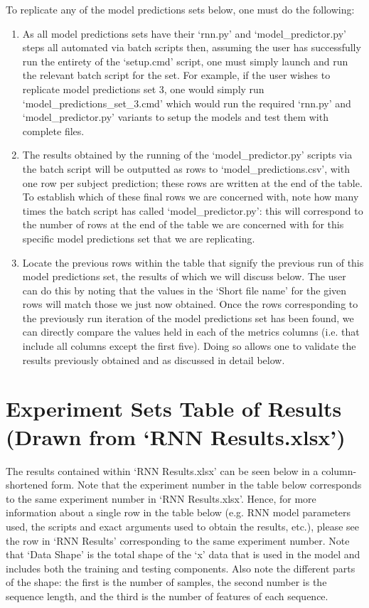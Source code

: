 \documentclass[12pt,twoside]{report}
\begin{document}
\quad To replicate any of the model predictions sets below, one must do the following:

\begin{enumerate}
	\item As all model predictions sets have their ‘rnn.py’ and ‘model\_predictor.py’ steps all automated via batch scripts then, assuming the user has successfully run the entirety of the ‘setup.cmd’ script, one must simply launch and run the relevant batch script for the set. For example, if the user wishes to replicate model predictions set 3, one would simply run ‘model\_predictions\_set\_3.cmd’ which would run the required ‘rnn.py’ and ‘model\_predictor.py’ variants to setup the models and test them with complete files.
	\item The results obtained by the running of the ‘model\_predictor.py’ scripts via the batch script will be outputted as rows to ‘model\_predictions.csv’, with one row per subject prediction; these rows are written at the end of the table. To establish which of these final rows we are concerned with, note how many times the batch script has called ‘model\_predictor.py’: this will correspond to the number of rows at the end of the table we are concerned with for this specific model predictions set that we are replicating.
	\item Locate the previous rows within the table that signify the previous run of this model predictions set, the results of which we will discuss below. The user can do this by noting that the values in the ‘Short file name’ for the given rows will match those we just now obtained. Once the rows corresponding to the previously run iteration of the model predictions set has been found, we can directly compare the values held in each of the metrics columns (i.e. that include all columns except the first five). Doing so allows one to validate the results previously obtained and as discussed in detail below.
\end{enumerate}




\section{Experiment Sets Table of Results (Drawn from ‘RNN Results.xlsx’)}

\quad The results contained within ‘RNN Results.xlsx’ can be seen below in a column-shortened form. Note that the experiment number in the table below corresponds to the same experiment number in ‘RNN Results.xlsx’. Hence, for more information about a single row in the table below (e.g. RNN model parameters used, the scripts and exact arguments used to obtain the results, etc.), please see the row in ‘RNN Results’ corresponding to the same experiment number. Note that ‘Data Shape’ is the total shape of the ‘x’ data that is used in the model and includes both the training and testing components. Also note the different parts of the shape: the first is the number of samples, the second number is the sequence length, and the third is the number of features of each sequence.
\end{document}
